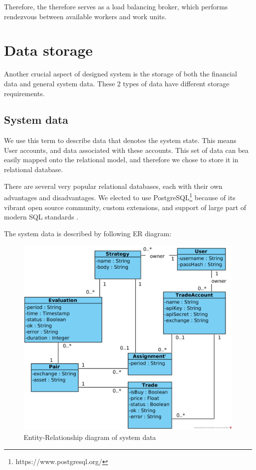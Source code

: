 Therefore, the  therefore serves as a load balancing broker, which performs rendezvous between
available workers and work units.
\section{Data storage}
Another crucial aspect of designed system is the storage of both the financial data and general system data.
These 2 types of data have different storage requirements.


\subsection{System data}
We use this term to describe data that denotes the system state. This means User accounts, and data associated with
these accounts. This set of data can bea easily mapped onto the relational model, and therefore we chose to store it
in relational database.

There are several very popular relational databases, each with their own advantages and disadvantages. We elected to
use PostgreSQL\footnote{https://www.postgresql.org/} because of its vibrant open source community, custom extensions, and support of large
part of modern SQL standards \cite{sql_comp}.

The system data is described by following ER diagram:
\begin{figure}[H]
    \includegraphics[width=\textwidth]{obrazky-figures/ERD.png}
    \caption{Entity-Relationship diagram of system data}
    \label{img:arch}
\end{figure}

